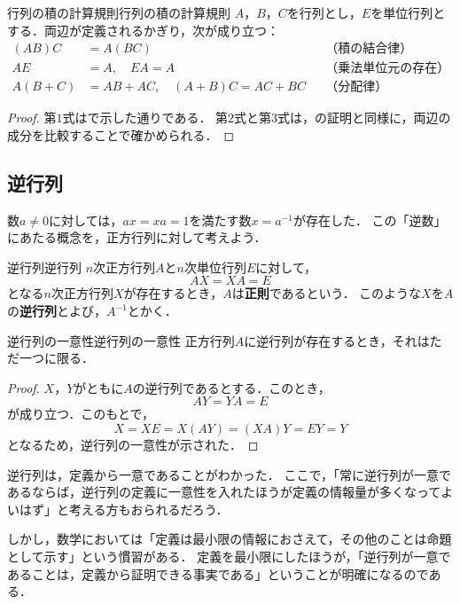 \begin{prop}{行列の積の計算規則}{行列の積の計算規則}
  $A$，$B$，$C$を行列とし，$E$を単位行列とする．両辺が定義されるかぎり，次が成り立つ：
  \begin{align*}
    (AB)C &= A(BC) && \text{（積の結合律）} \\
    AE &= A, \quad EA = A && \text{（乗法単位元の存在）} \\
    A(B + C) &= AB + AC, \quad (A + B)C = AC + BC && \text{（分配律）}
  \end{align*}
\end{prop}

\begin{leftbar}
\begin{proof}
  第$1$式はで示した通りである．
  第$2$式と第$3$式は，の証明と同様に，両辺の成分を比較することで確かめられる．
\end{proof}
\end{leftbar}

\subsection{逆行列}

数$a \ne 0$に対しては，$ax = xa = 1$を満たす数$x = a^{-1}$が存在した．
この「逆数」にあたる概念を，正方行列に対して考えよう．

\begin{definition}{逆行列}{逆行列}
  $n$次正方行列$A$と$n$次単位行列$E$に対して，
  \[
    AX = XA = E
  \]
  となる$n$次正方行列$X$が存在するとき，$A$は\textbf{正則}であるという．
  このような$X$を$A$の\textbf{逆行列}とよび，$A^{-1}$とかく．
\end{definition}

\begin{prop}{逆行列の一意性}{逆行列の一意性}
  正方行列$A$に逆行列が存在するとき，それはただ一つに限る．
\end{prop}

\begin{leftbar}
\begin{proof}
  $X$，$Y$がともに$A$の逆行列であるとする．このとき，
  \[
    AY = YA = E
  \]
  が成り立つ．このもとで，
  \[
    X = XE = X(AY) = (XA)Y = EY = Y
  \]
  となるため，逆行列の一意性が示された．
\end{proof}
\end{leftbar}

\begin{remark}[定義は最小限にとどめる]
  逆行列は，定義から一意であることがわかった．
  ここで，「常に逆行列が一意であるならば，逆行列の定義に一意性を入れたほうが定義の情報量が多くなってよいはず」と考える方もおられるだろう．

  しかし，数学においては「定義は最小限の情報におさえて，その他のことは命題として示す」という慣習がある．
  定義を最小限にしたほうが，「逆行列が一意であることは，定義から証明できる事実である」ということが明確になるのである．
\end{remark}

